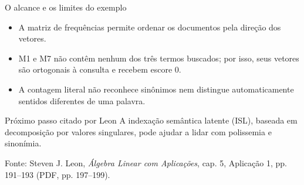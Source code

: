 \documentclass{beamer}
\begin{document}
\begin{frame}{O alcance e os limites do exemplo}
  \begin{itemize}
    \item A matriz de frequências permite ordenar os documentos pela direção dos vetores.
    \item M1 e M7 não contêm nenhum dos três termos buscados; por isso, seus vetores são ortogonais à consulta e recebem escore 0.
    \item A contagem literal não reconhece sinônimos nem distingue automaticamente sentidos diferentes de uma palavra.
  \end{itemize}
  \begin{block}{Próximo passo citado por Leon}
    A indexação semântica latente (ISL), baseada em decomposição por valores singulares, pode ajudar a lidar com polissemia e sinonímia.
  \end{block}
  \vfill
  {\tiny Fonte: Steven J. Leon, \textit{Álgebra Linear com Aplicações}, cap. 5, Aplicação 1, pp. 191--193 (PDF, pp. 197--199).}
\end{frame}
\end{document}
